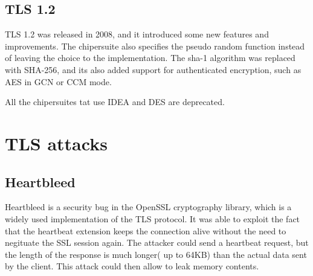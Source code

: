 \subsection{TLS 1.2}
TLS 1.2 was released in 2008, and it introduced some new features and 
improvements. The chipersuite also specifies the pseudo random
function instead of leaving the choice to the implementation. The
sha-1 algorithm was replaced with SHA-256, and its also added support
for authenticated encryption, such as AES in GCN or CCM mode.

All the chipersuites tat use IDEA and DES are deprecated.

\section{TLS attacks}
\subsection{Heartbleed}
Heartbleed is a security bug in the OpenSSL cryptography library,
which is a widely used implementation of the TLS protocol. It was able
to exploit the fact that the heartbeat extension keeps the connection
alive without the need to negituate the SSL session again. The
attacker could send a heartbeat request, but the length of the 
response is much longer( up to 64KB) than the actual data sent by the
client. This attack could then allow to leak memory contents.
